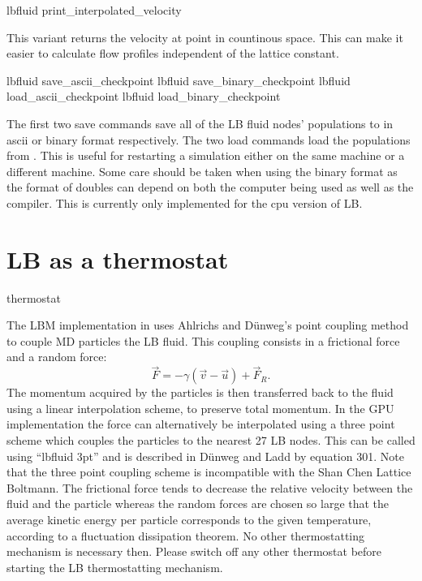 \begin{essyntax}
  lbfluid print_interpolated_velocity   
\end{essyntax}
This variant returns the velocity at point in countinous space. 
This can make it easier to calculate flow profiles independent of
the lattice constant.

\begin{essyntax}
  lbfluid save_ascii_checkpoint 
  lbfluid save_binary_checkpoint 
  lbfluid load_ascii_checkpoint 
  lbfluid load_binary_checkpoint 
\end{essyntax}
The first two save commands save all of the LB fluid nodes' populations to  in ascii or binary format respectively.
The two load commands load the populations from .  This is  useful for restarting a simulation either on the same
machine or a different machine.  Some care should be taken when using the binary format as the format of doubles can depend
on both the computer being used as well as the compiler.  This is currently  only implemented for the cpu version of LB.

\section{LB as a thermostat}
\begin{essyntax}
  thermostat  
  \begin{features}
  \end{features}
\end{essyntax}
The LBM implementation in \es uses Ahlrichs and D\"unweg's point coupling method
to couple MD particles the LB fluid. This coupling consists
in a frictional force and a random force:
\begin{equation*}
  \vec{F} = -\gamma \left(\vec{v}-\vec{u}\right) + \vec{F}_R.
\end{equation*}
The momentum acquired by the particles is then transferred back to the fluid using a linear interpolation scheme, to preserve total momentum.
In the GPU implementation the force can alternatively be interpolated using a three point scheme which couples the particles to the nearest 27 LB nodes.
This can be called using ``lbfluid  3pt'' and is described in D\"{u}nweg and Ladd by equation 301\cite{duenweg08a}. Note that the three point coupling scheme is incompatible with the Shan Chen Lattice Boltmann.
The frictional force tends to decrease the relative velocity
between the fluid and the particle whereas the random forces are chosen
so large that the average kinetic energy per particle corresponds to
the given temperature, according to a fluctuation dissipation theorem.
No other thermostatting mechanism is necessary then. Please switch off any other thermostat 
 before starting the LB thermostatting mechanism.

